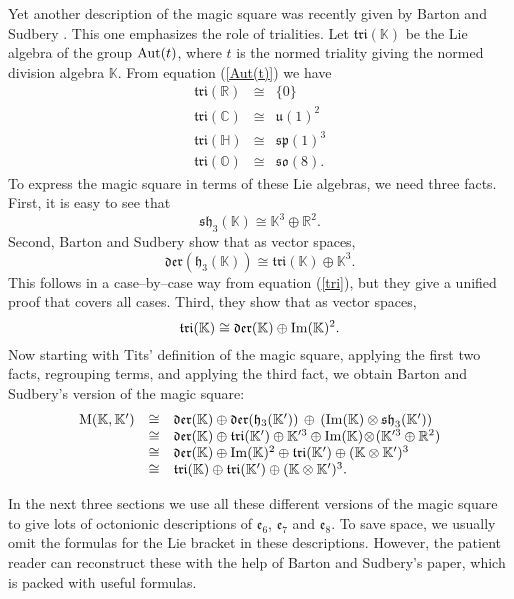 \documentclass[12pt]{article}
\newcommand\R{{\mathbb R}}
\newcommand\C{{\mathbb C}}
\renewcommand\H{{\mathbb H}}
\newcommand\K{{\mathbb K}}
\renewcommand\O{{\mathbb O}}
\newcommand{\M}{{\rm M}}
\newcommand{\so}{{\mathfrak {so}}}
\newcommand{\symp}{{\mathfrak {sp}}}
\renewcommand{\u}{{\mathfrak {u}}}
\newcommand{\e}{{\mathfrak {e}}}
\newcommand{\h}{{\mathfrak {h}}}
\newcommand{\sh}{{\mathfrak {sh}}}
\newcommand{\Der}{{\mathfrak {der}}}
\newcommand{\Tri}{{\mathfrak {tri}}}
\renewcommand{\Im}{{\rm Im}}
\newcommand{\Aut}{{\rm Aut}}
\newcommand{\tensor}{\otimes}
\newcommand{\iso}{\cong}
\newcommand{\be}{\begin{equation}}
\newcommand{\ee}{\end{equation}}
\begin{document}
Yet another description of the magic square was recently given by
Barton and Sudbery \cite{BS}.  This one emphasizes the role of 
trialities.  Let $\Tri(\K)$ be the Lie algebra of the group $\Aut(t)$,
where $t$ is the normed triality giving the normed division algebra
$\K$.  From equation (\ref{Aut(t)}) we have
\be
\begin{array}{lcl} 
    \Tri(\R) &\iso& \{0\}    \\
    \Tri(\C) &\iso& \u(1)^2  \\
    \Tri(\H) &\iso& \symp(1)^3 \\
    \Tri(\O) &\iso& \so(8)  .
\end{array} 
\label{tri}
\ee
To express the magic square in terms of these Lie algebras, we need
three facts.  First, it is easy to see that 
\[     \sh_3(\K) \iso \K^3 \oplus \R^2 .\]
Second, Barton and Sudbery show that as vector spaces,
\[    \Der(\h_3(\K)) \iso \Tri(\K) \oplus \K^3 . \]
This follows in a case--by--case way from equation
(\ref{tri}), but they give a unified proof that covers all cases.
Third, they show that as vector spaces,
\[     \Tri(\K) \iso \Der(\K) \oplus \Im(\K)^2 . \]
Now starting with Tits' definition of the magic square,
applying the first two facts, regrouping terms, and applying 
the third fact, we obtain Barton and Sudbery's version of the 
magic square:
\[
\begin{array}{lcl}
\M(\K,\K') 
&\iso& \Der(\K) \oplus \Der(\h_3(\K')) \, \oplus \, 
(\Im(\K) \tensor \sh_3(\K'))   \\
&\iso & \Der(\K) \oplus \Tri(\K') \oplus \K'^3 \oplus 
\Im(\K) \! \tensor \! (\K'^3 \oplus \R^2)  \\
&\iso & \Der(\K) \oplus \Im(\K)^2 \oplus \Tri(\K') \oplus (\K \tensor \K')^3 \\
&\iso &  \Tri(\K) \oplus \Tri(\K') \oplus (\K \tensor \K')^3  .
\end{array}
\]

In the next three sections we use all these different versions of the
magic square to give lots of octonionic descriptions of $\e_6$, $\e_7$
and $\e_8$.  To save space, we usually omit the formulas for the Lie
bracket in these descriptions. However, the patient reader can
reconstruct these with the help of Barton and Sudbery's paper, which 
is packed with useful formulas.
\end{document}
